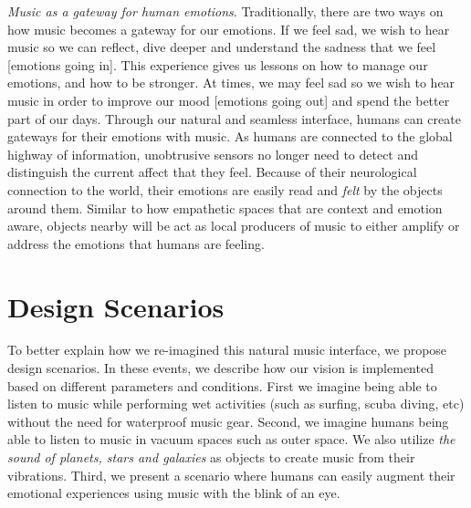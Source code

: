 \documentclass[acmtog]{acmart}
\begin{document}
\textit{Music as a gateway for human emotions}. Traditionally, there are two ways on how music becomes a gateway for our emotions. If we feel sad, we wish to hear music so we can reflect, dive deeper and understand the sadness that we feel [emotions going in]. This experience gives us lessons on how to manage our emotions, and how to be stronger. At times, we may feel sad so we wish to hear music in order to improve our mood [emotions going out] and spend the better part of our days. Through our natural and seamless interface, humans can create gateways for their emotions with music. As humans are connected to the global highway of information, unobtrusive sensors no longer need to detect and distinguish the current affect that they feel. Because of their neurological connection to the world, their emotions are easily read and \textit{felt} by the objects around them. Similar to how empathetic spaces that are context and emotion aware, objects nearby will be act as local producers of music to either amplify or address the emotions that humans are feeling. 
% 
\section{Design Scenarios}
To better explain how we re-imagined this natural music interface, we propose design scenarios. In these events, we describe how our vision is implemented based on different parameters and conditions. First we imagine being able to listen to music while performing wet activities (such as surfing, scuba diving, etc) without the need for waterproof music gear. Second, we imagine humans being able to listen to music in vacuum spaces such as outer space. We also utilize \textit{the sound of planets, stars and galaxies} as objects to create music from their vibrations. Third, we present a scenario where humans can easily augment their emotional experiences using music with the blink of an eye. 
\end{document}
